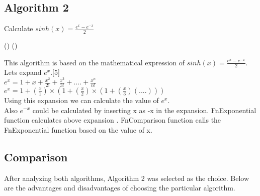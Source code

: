 \documentclass{article}
\begin{document}
\subsection{Algorithm 2}
\begin{algorithm}
\caption{ Calculate $sinh(x)=\frac {e^x-e^{-x}}{2}$}
\SetAlgoLined
\Fn(){}{
}
\Fn(){}{
}
\end{algorithm}
\vspace{5mm}
This algorithm is based on the mathematical expression of $sinh(x)=\frac{e^x-e^{-x}}{2}$. 
Lets expand $e^x$.[5]\\
$e^x= 1+x+\frac{x^2}{2!}+\frac{x^3}{3!}+....+\frac{x^n}{n!}$\\
$e^x= 1+(\frac{x}{1})\times(1+ (\frac{x}{2})\times(1+(\frac{x}{3})(....)))$\\
Using this expansion we can calculate the value of $e^x$.\\
Also $e^{-x}$ could be calculated by inserting x as -x in the expansion.
FnExponential function calculates above expansion . 
FnComparison function calls the FnExponential function based on the value of x.
\pagebreak
\subsection{Comparison}
After analyzing both algorithms, Algorithm 2 was selected as the choice. Below are the advantages and disadvantages of choosing the particular algorithm.
\end{document}

